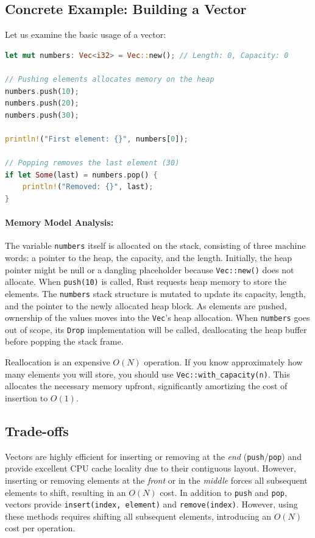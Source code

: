 \subsection{Concrete Example: Building a Vector}
Let us examine the basic usage of a vector:

\begin{lstlisting}[language=Rust]
let mut numbers: Vec<i32> = Vec::new(); // Length: 0, Capacity: 0

// Pushing elements allocates memory on the heap
numbers.push(10);
numbers.push(20);
numbers.push(30);

println!("First element: {}", numbers[0]);

// Popping removes the last element (30)
if let Some(last) = numbers.pop() {
    println!("Removed: {}", last);
}
\end{lstlisting}

\paragraph{Memory Model Analysis:}
The variable \texttt{numbers} itself is allocated on the stack, consisting of three machine words: a pointer to the heap, the capacity, and the length. Initially, the heap pointer might be null or a dangling placeholder because \texttt{Vec::new()} does not allocate. When \texttt{push(10)} is called, Rust requests heap memory to store the elements. The \texttt{numbers} stack structure is mutated to update its capacity, length, and the pointer to the newly allocated heap block. As elements are pushed, ownership of the values moves into the \texttt{Vec}'s heap allocation. When \texttt{numbers} goes out of scope, its \texttt{Drop} implementation will be called, deallocating the heap buffer before popping the stack frame.

\begin{notebox}
Reallocation is an expensive $O(N)$ operation. If you know approximately how many elements you will store, you should use \texttt{Vec::with\_capacity(n)}. This allocates the necessary memory upfront, significantly amortizing the cost of insertion to $O(1)$.
\end{notebox}

\subsection{Trade-offs}
Vectors are highly efficient for inserting or removing at the \emph{end} (\texttt{push}/\texttt{pop}) and provide excellent CPU cache locality due to their contiguous layout. However, inserting or removing elements at the \emph{front} or in the \emph{middle} forces all subsequent elements to shift, resulting in an $O(N)$ cost. 
In addition to \texttt{push} and \texttt{pop}, vectors provide \texttt{insert(index, element)} and \texttt{remove(index)}. However, using these methods requires shifting all subsequent elements, introducing an $O(N)$ cost per operation.


